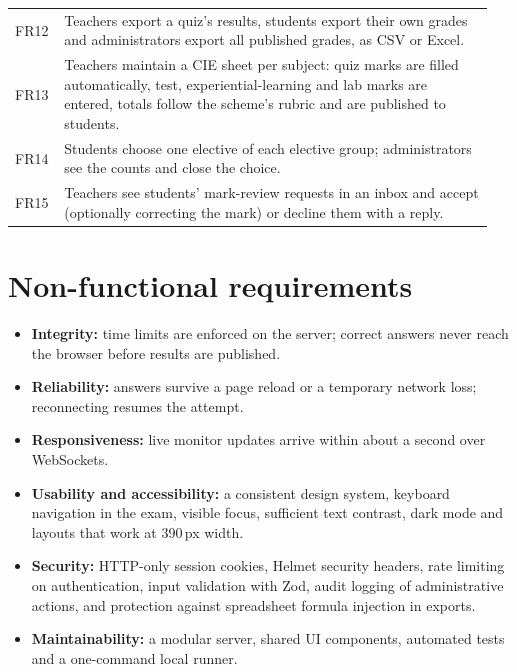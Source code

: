 \documentclass[12pt,a4paper,oneside]{report}
\begin{document}
\begin{longtable}{@{}p{0.09\linewidth}p{0.86\linewidth}@{}}
FR12 & Teachers export a quiz's results, students export their own grades and administrators export all published grades, as CSV or Excel.\\
FR13 & Teachers maintain a CIE sheet per subject: quiz marks are filled automatically, test, experiential-learning and lab marks are entered, totals follow the scheme's rubric and are published to students.\\
FR14 & Students choose one elective of each elective group; administrators see the counts and close the choice.\\
FR15 & Teachers see students' mark-review requests in an inbox and accept (optionally correcting the mark) or decline them with a reply.\\
\bottomrule
\end{longtable}

\section{Non-functional requirements}
\begin{itemize}
  \item \textbf{Integrity:} time limits are enforced on the server; correct answers never reach the browser before results are published.
  \item \textbf{Reliability:} answers survive a page reload or a temporary network loss; reconnecting resumes the attempt.
  \item \textbf{Responsiveness:} live monitor updates arrive within about a second over WebSockets.
  \item \textbf{Usability and accessibility:} a consistent design system, keyboard navigation in the exam, visible focus, sufficient text contrast, dark mode and layouts that work at 390\,px width.
  \item \textbf{Security:} HTTP-only session cookies, Helmet security headers, rate limiting on authentication, input validation with Zod, audit logging of administrative actions, and protection against spreadsheet formula injection in exports.
  \item \textbf{Maintainability:} a modular server, shared UI components, automated tests and a one-command local runner.
\end{itemize}
\end{document}
